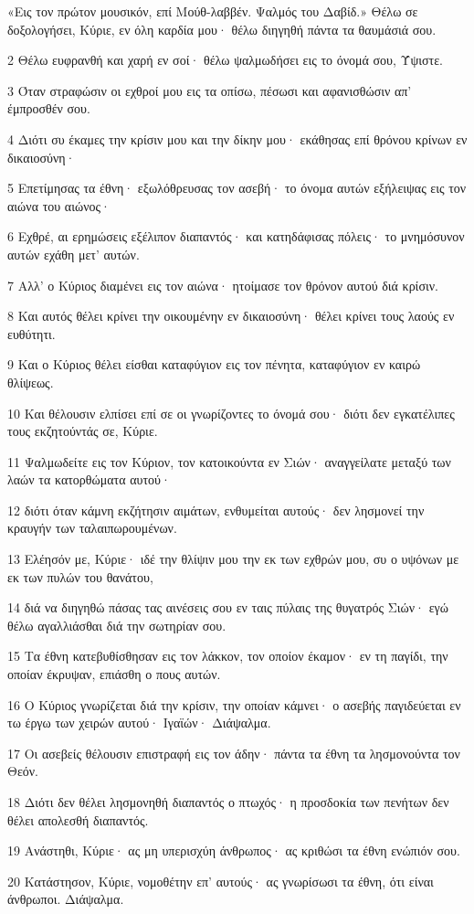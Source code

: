 \par «Εις τον πρώτον μουσικόν, επί Μούθ-λαββέν. Ψαλμός του Δαβίδ.» Θέλω σε δοξολογήσει, Κύριε, εν όλη καρδία μου· θέλω διηγηθή πάντα τα θαυμάσιά σου.
\par 2 Θέλω ευφρανθή και χαρή εν σοί· θέλω ψαλμωδήσει εις το όνομά σου, Ύψιστε.
\par 3 Όταν στραφώσιν οι εχθροί μου εις τα οπίσω, πέσωσι και αφανισθώσιν απ' έμπροσθέν σου.
\par 4 Διότι συ έκαμες την κρίσιν μου και την δίκην μου· εκάθησας επί θρόνου κρίνων εν δικαιοσύνη·
\par 5 Επετίμησας τα έθνη· εξωλόθρευσας τον ασεβή· το όνομα αυτών εξήλειψας εις τον αιώνα του αιώνος·
\par 6 Εχθρέ, αι ερημώσεις εξέλιπον διαπαντός· και κατηδάφισας πόλεις· το μνημόσυνον αυτών εχάθη μετ' αυτών.
\par 7 Αλλ' ο Κύριος διαμένει εις τον αιώνα· ητοίμασε τον θρόνον αυτού διά κρίσιν.
\par 8 Και αυτός θέλει κρίνει την οικουμένην εν δικαιοσύνη· θέλει κρίνει τους λαούς εν ευθύτητι.
\par 9 Και ο Κύριος θέλει είσθαι καταφύγιον εις τον πένητα, καταφύγιον εν καιρώ θλίψεως.
\par 10 Και θέλουσιν ελπίσει επί σε οι γνωρίζοντες το όνομά σου· διότι δεν εγκατέλιπες τους εκζητούντάς σε, Κύριε.
\par 11 Ψαλμωδείτε εις τον Κύριον, τον κατοικούντα εν Σιών· αναγγείλατε μεταξύ των λαών τα κατορθώματα αυτού·
\par 12 διότι όταν κάμνη εκζήτησιν αιμάτων, ενθυμείται αυτούς· δεν λησμονεί την κραυγήν των ταλαιπωρουμένων.
\par 13 Ελέησόν με, Κύριε· ιδέ την θλίψιν μου την εκ των εχθρών μου, συ ο υψόνων με εκ των πυλών του θανάτου,
\par 14 διά να διηγηθώ πάσας τας αινέσεις σου εν ταις πύλαις της θυγατρός Σιών· εγώ θέλω αγαλλιάσθαι διά την σωτηρίαν σου.
\par 15 Τα έθνη κατεβυθίσθησαν εις τον λάκκον, τον οποίον έκαμον· εν τη παγίδι, την οποίαν έκρυψαν, επιάσθη ο πους αυτών.
\par 16 Ο Κύριος γνωρίζεται διά την κρίσιν, την οποίαν κάμνει· ο ασεβής παγιδεύεται εν τω έργω των χειρών αυτού· Ιγαϊών· Διάψαλμα.
\par 17 Οι ασεβείς θέλουσιν επιστραφή εις τον άδην· πάντα τα έθνη τα λησμονούντα τον Θεόν.
\par 18 Διότι δεν θέλει λησμονηθή διαπαντός ο πτωχός· η προσδοκία των πενήτων δεν θέλει απολεσθή διαπαντός.
\par 19 Ανάστηθι, Κύριε· ας μη υπερισχύη άνθρωπος· ας κριθώσι τα έθνη ενώπιόν σου.
\par 20 Κατάστησον, Κύριε, νομοθέτην επ' αυτούς· ας γνωρίσωσι τα έθνη, ότι είναι άνθρωποι. Διάψαλμα.


